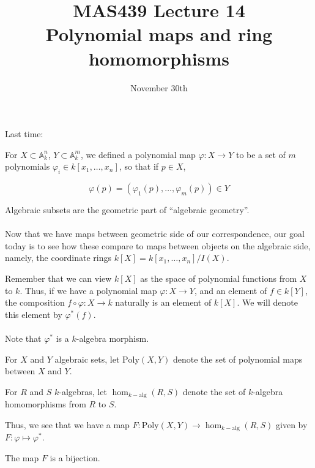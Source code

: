 \documentclass{beamer}
\title{MAS439 Lecture 14 \\ Polynomial maps and ring homomorphisms}
\date{November 30th}
\begin{document}
\begin{frame}
\titlepage
\end{frame}


 \begin{frame}{Last time:}

For $X\subset \mathbb{A}_k^n$, $Y\subset \mathbb{A}_k^m$, we defined a polynomial map $\varphi:X \to Y$ to be a set of $m$ polynomials $\varphi_i\in k[x_1,\dots, x_n]$, so that if $p\in X$, 

$$\varphi(p)=(\varphi_1(p),\dots, \varphi_m(p))\in Y$$

Algebraic subsets are the geometric part of ``algebraic geometry''.  \\~\\

Now that we have maps between geometric side of our correspondence, our goal today is to see how these compare to maps between objects on the algebraic side, namely, the coordinate rings $k[X]=k[x_1,\dots, x_n]/I(X)$.

\end{frame}

\begin{frame}
Remember that we can view $k[X]$ as the space of polynomial functions from $X$ to $k$.  Thus, if we have a polynomial map $\varphi:X\to Y$, and an element of $f\in k[Y]$, the composition $f\circ \varphi:X\to k$ naturally is an element of $k[X]$.  We will denote this element by $\varphi^*(f)$.
\\~\\
Note that $\varphi^*$ is a $k$-algebra morphism.



\end{frame}

\begin{frame}

\begin{definition}
For $X$ and $Y$ algebraic sets, let $\text{Poly}(X,Y)$ denote the set of polynomial maps between $X$ and $Y$.
\end{definition}

\begin{definition}
For $R$ and $S$ $k$-algebras, let $\hom_{k-\text{alg}}(R,S)$ denote the set of $k$-algebra homomorphisms from $R$ to $S$.
\end{definition}

Thus, we see that we have a map $F:\text{Poly}(X,Y)\to \hom_{k-\text{alg}}(R,S)$ given by $F:\varphi\mapsto \varphi^*$.


\begin{lemma}
The map $F$ is a bijection.
\end{lemma}


\end{frame}
\end{document}
